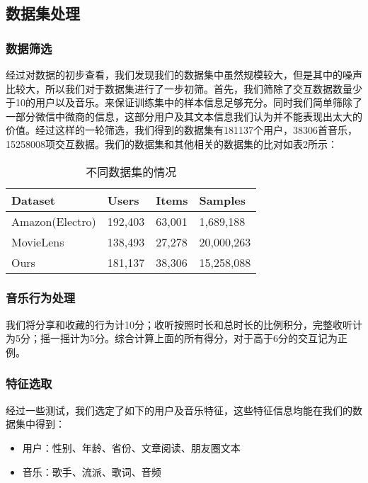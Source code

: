 \subsection{数据集处理}
\subsubsection{数据筛选}
经过对数据的初步查看，我们发现我们的数据集中虽然规模较大，但是其中的噪声比较大，所以我们对于数据集进行了一步初筛。首先，我们筛除了交互数据数量少于10的用户以及音乐。来保证训练集中的样本信息足够充分。同时我们简单筛除了一部分微信中微商的信息，这部分用户及其文本信息我们认为并不能表现出太大的价值。经过这样的一轮筛选，我们得到的数据集有181137个用户，38306首音乐，15258008项交互数据。我们的数据集和其他相关的数据集的比对如表2所示：

\begin{table}[htbp]
\centering
\caption{不同数据集的情况}
\begin{tabular}{|l|l|l|l|}
\hline

Dataset & Users & Items & Samples \\ \hline
Amazon(Electro) & 192,403 & 63,001 & 1,689,188 \\ \hline
MovieLens\cite{Harper:2015:MDH:2866565.2827872} & 138,493 & 27,278 & 20,000,263 \\ \hline
Ours & 181,137 & 38,306 & 15,258,088 \\ \hline

\end{tabular}
\end{table}

\subsubsection{音乐行为处理}
我们将分享和收藏的行为计10分；收听按照时长和总时长的比例积分，完整收听计为5分；摇一摇计为5分。综合计算上面的所有得分，对于高于6分的交互记为正例。

\subsubsection{特征选取}
经过一些测试，我们选定了如下的用户及音乐特征，这些特征信息均能在我们的数据集中得到：
\begin{itemize}
    \item 用户：性别、年龄、省份、文章阅读、朋友圈文本
    \item 音乐：歌手、流派、歌词、音频
\end{itemize}



